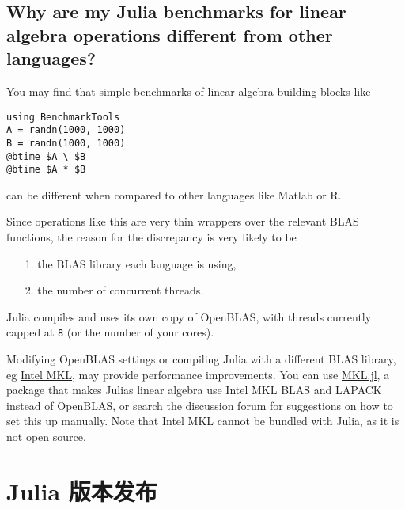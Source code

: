 \hypertarget{2217516185420134366}{}


\subsection{Why are my Julia benchmarks for linear algebra operations different from other languages?}



You may find that simple benchmarks of linear algebra building blocks like




\begin{verbatim}
using BenchmarkTools
A = randn(1000, 1000)
B = randn(1000, 1000)
@btime $A \ $B
@btime $A * $B
\end{verbatim}



can be different when compared to other languages like Matlab or R.



Since operations like this are very thin wrappers over the relevant BLAS functions, the reason for the discrepancy is very likely to be



\begin{itemize}
\item[1. ] the BLAS library each language is using,


\item[2. ] the number of concurrent threads.

\end{itemize}


Julia compiles and uses its own copy of OpenBLAS, with threads currently capped at \texttt{8} (or the number of your cores).



Modifying OpenBLAS settings or compiling Julia with a different BLAS library, eg \href{https://software.intel.com/en-us/mkl}{Intel MKL}, may provide performance improvements. You can use \href{https://github.com/JuliaComputing/MKL.jl}{MKL.jl}, a package that makes Julia{\textquotesingle}s linear algebra use Intel MKL BLAS and LAPACK instead of OpenBLAS, or search the discussion forum for suggestions on how to set this up manually. Note that Intel MKL cannot be bundled with Julia, as it is not open source.



\hypertarget{13975497382718262394}{}


\section{Julia 版本发布}



